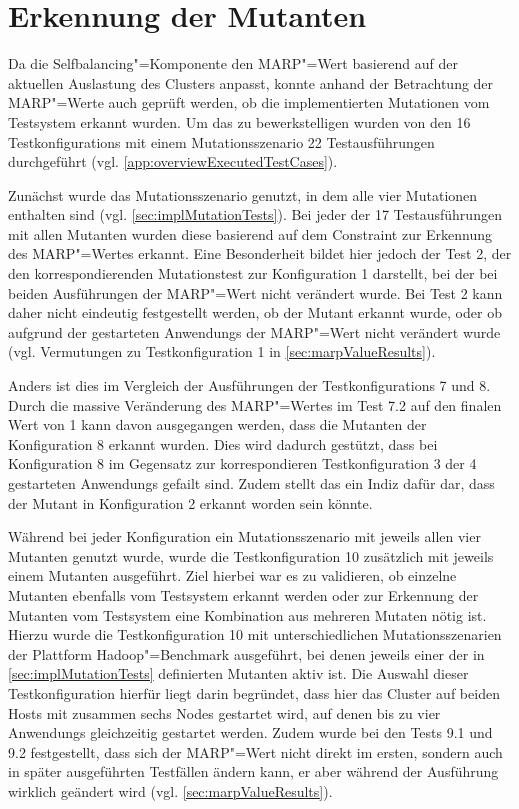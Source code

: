 \section{Erkennung der Mutanten}
\label{sec:killingMutants}

Da die Selfbalancing"=Komponente den \gls{MARP}"=Wert basierend auf der aktuellen Auslastung des Clusters anpasst, konnte anhand der Betrachtung der \gls{MARP}"=Werte auch geprüft werden, ob die implementierten Mutationen vom Testsystem erkannt wurden.
Um das zu bewerkstelligen wurden von den 16 \glspl{Testkonfiguration} mit einem Mutationsszenario 22 Testausführungen durchgeführt (vgl. \cref{app:overviewExecutedTestCases}).

Zunächst wurde das Mutationsszenario genutzt, in dem alle vier Mutationen enthalten sind (vgl. \cref{sec:implMutationTests}).
Bei jeder der 17 Testausführungen mit allen Mutanten wurden diese basierend auf dem Constraint zur Erkennung des \gls{MARP}"=Wertes erkannt.
Eine Besonderheit bildet hier jedoch der \gls{Test} 2, der den korrespondierenden Mutationstest zur Konfiguration 1 darstellt, bei der bei beiden Ausführungen der \gls{MARP}"=Wert nicht verändert wurde.
Bei \gls{Test} 2 kann daher nicht eindeutig festgestellt werden, ob der Mutant erkannt wurde, oder ob aufgrund der gestarteten \glspl{Anwendung} der \gls{MARP}"=Wert nicht verändert wurde (vgl. Vermutungen zu \gls{Testkonfiguration} 1 in \cref{sec:marpValueResults}).

Anders ist dies im Vergleich der Ausführungen der \glspl{Testkonfiguration} 7 und 8.
Durch die massive Veränderung des \gls{MARP}"=Wertes im \gls{Test} 7.2 auf den finalen Wert von 1 kann davon ausgegangen werden, dass die Mutanten der Konfiguration 8 erkannt wurden.
Dies wird dadurch gestützt, dass bei Konfiguration 8 im Gegensatz zur korrespondieren \gls{Testkonfiguration} 3 der 4 gestarteten \glspl{Anwendung} gefailt sind.
Zudem stellt das ein Indiz dafür dar, dass der Mutant in Konfiguration 2 erkannt worden sein könnte.

Während bei jeder Konfiguration ein Mutationsszenario mit jeweils allen vier Mutanten genutzt wurde, wurde die \gls{Testkonfiguration} 10 zusätzlich mit jeweils einem Mutanten ausgeführt.
Ziel hierbei war es zu validieren, ob einzelne Mutanten ebenfalls vom Testsystem erkannt werden oder zur Erkennung der Mutanten vom Testsystem eine Kombination aus mehreren Mutaten nötig ist.
Hierzu wurde die \gls{Testkonfiguration} 10 mit unterschiedlichen Mutationsszenarien der Plattform Hadoop"=Benchmark ausgeführt, bei denen jeweils einer der in \cref{sec:implMutationTests} definierten Mutanten aktiv ist.
Die Auswahl dieser \gls{Testkonfiguration} hierfür liegt darin begründet, dass hier das Cluster auf beiden Hosts mit zusammen sechs Nodes gestartet wird, auf denen bis zu vier \glspl{Anwendung} gleichzeitig gestartet werden.
Zudem wurde bei den \glspl{Test} 9.1 und 9.2 festgestellt, dass sich der \gls{MARP}"=Wert nicht direkt im ersten, sondern auch in später ausgeführten Testfällen ändern kann, er aber während der Ausführung wirklich geändert wird (vgl. \cref{sec:marpValueResults}).

